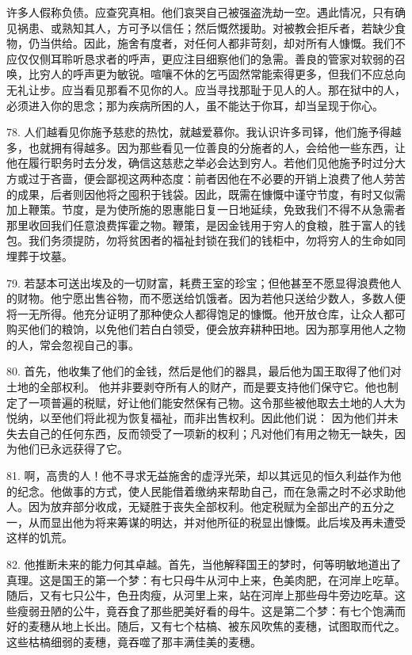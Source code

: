 许多人假称负债。应查究真相。他们哀哭自己被强盗洗劫一空。遇此情况，只有确见祸患、或熟知其人，方可予以信任；然后慨然援助。对被教会拒斥者，若缺少食物，仍当供给。因此，施舍有度者，对任何人都非苛刻，却对所有人慷慨。我们不应仅仅侧耳聆听恳求者的呼声，更应注目细察他们的急需。善良的管家对软弱的召唤，比穷人的呼声更为敏锐。喧嚷不休的乞丐固然常能索得更多，但我们不应总向无礼让步。应当看见那看不见你的人。应当寻找那耻于见人的人。那在狱中的人，必须进入你的思念；那为疾病所困的人，虽不能达于你耳，却当呈现于你心。\par

78. 人们越看见你施予慈悲的热忱，就越爱慕你。我认识许多司铎，他们施予得越多，也就拥有得越多。因为那些看见一位善良的分施者的人，会给他一些东西，让他在履行职务时去分发，确信这慈悲之举必会达到穷人。若他们见他施予时过分大方或过于吝啬，便会鄙视这两种态度：前者因他在不必要的开销上浪费了他人劳苦的成果，后者则因他将之囤积于钱袋。因此，既需在慷慨中谨守节度，有时又似需加上鞭策。节度，是为使所施的恩惠能日复一日地延续，免致我们不得不从急需者那里收回我们任意浪费挥霍之物。鞭策，是因金钱用于穷人的食粮，胜于富人的钱包。我们务须提防，勿将贫困者的福祉封锁在我们的钱柜中，勿将穷人的生命如同埋葬于坟墓。\par

79. 若瑟本可送出埃及的一切财富，耗费王室的珍宝；但他甚至不愿显得浪费他人的财物。他宁愿出售谷物，而不愿送给饥饿者。因为若他只送给少数人，多数人便将一无所得。他充分证明了那种使众人都得饱足的慷慨。他开放仓库，让众人都可购买他们的粮饷，以免他们若白白领受，便会放弃耕种田地。因为那享用他人之物的人，常会忽视自己的事。\par

80. 首先，他收集了他们的金钱，然后是他们的器具，最后他为国王取得了他们对土地的全部权利。 他并非要剥夺所有人的财产，而是要支持他们保守它。他也制定了一项普遍的税赋，好让他们能安然保有己物。这令那些被他取去土地的人大为悦纳，以至他们将此视为恢复福祉，而非出售权利。因此他们说：  因为他们并未失去自己的任何东西，反而领受了一项新的权利；凡对他们有用之物无一缺失，因为他们已永远获得了它。\par

81. 啊，高贵的人！他不寻求无益施舍的虚浮光荣，却以其远见的恒久利益作为他的纪念。他做事的方式，使人民能借着缴纳来帮助自己，而在急需之时不必求助他人。因为放弃部分收成，无疑胜于丧失全部权利。他定税赋为全部出产的五分之一，从而显出他为将来筹谋的明达，并对他所征的税显出慷慨。此后埃及再未遭受这样的饥荒。\par

82. 他推断未来的能力何其卓越。首先，当他解释国王的梦时，何等明敏地道出了真理。这是国王的第一个梦：有七只母牛从河中上来，色美肉肥，在河岸上吃草。随后，又有七只公牛，色丑肉瘦，从河里上来，站在河岸上那些母牛旁边吃草。这些瘦弱丑陋的公牛，竟吞食了那些肥美好看的母牛。这是第二个梦：有七个饱满而好的麦穗从地上长出。随后，又有七个枯槁、被东风吹焦的麦穗，试图取而代之。这些枯槁细弱的麦穗，竟吞噬了那丰满佳美的麦穗。\par


